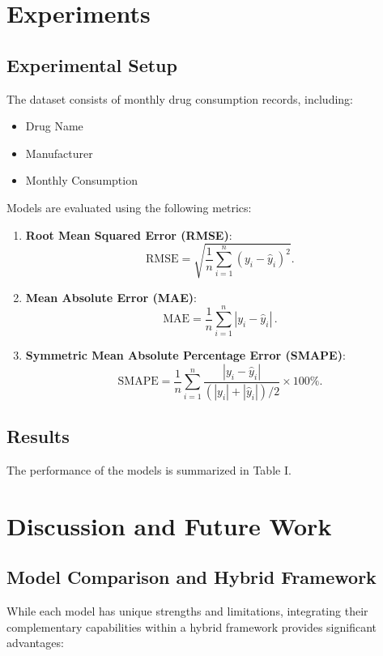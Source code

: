 \documentclass[journal]{IEEEtran}
\begin{document}
\section{Experiments}
\subsection{Experimental Setup}
The dataset consists of monthly drug consumption records, including:

\begin{itemize}
    \item Drug Name
    \item Manufacturer
    \item Monthly Consumption
\end{itemize}

Models are evaluated using the following metrics:

\begin{enumerate}
    \item \textbf{Root Mean Squared Error (RMSE)}:
    \begin{equation}
    \text{RMSE}=\sqrt{\frac{1}{n}\sum_{i=1}^{n}(y_{i}-\hat{y}_{i})^{2}}.
    \end{equation}

    \item \textbf{Mean Absolute Error (MAE)}:
    \begin{equation}
    \text{MAE}=\frac{1}{n}\sum_{i=1}^{n}|y_{i}-\hat{y}_{i}|\,.
    \end{equation}

    \item \textbf{Symmetric Mean Absolute Percentage Error (SMAPE)}:
    \begin{equation}
    \text{SMAPE}=\frac{1}{n}\sum_{i=1}^{n}\frac{|y_{i}-\hat{y}_{i}|}{(|y_{i}|+|\hat{y}_{i}|)/2}\times 100\%.
    \end{equation}
\end{enumerate}

\subsection{Results}
The performance of the models is summarized in Table I.

\section{Discussion and Future Work}
\subsection{Model Comparison and Hybrid Framework}
While each model has unique strengths and limitations, integrating their complementary capabilities within a hybrid framework provides significant advantages:
\end{document}
